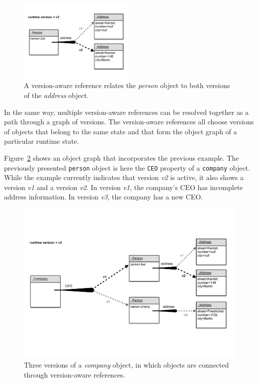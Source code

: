 \begin{figure}[h]
    \centering
    \includegraphics[width=0.5\textwidth]{figures/4_approach/5_versionAwareReferenceFollowingVersion2.pdf}
    \caption{A version-aware reference relates the \emph{person} object to both versions of the \emph{address} object.}
    \label{fig:VersionAwareReferenceFollowingVersion2}
\end{figure}

In the same way, multiple version-aware references can be resolved together as a path through a graph of versions.
The version-aware references all choose versions of objects that belong to the same state and that form the object graph of a particular runtime state.

Figure~\ref{fig:ObjectGraphWithWithReferencesResolvedAlongVersion2} shows an object graph that incorporates the previous example.
The previously presented \lstinline{person} object is here the \lstinline{CEO} property of a \lstinline{company} object.
While the example currently indicates that version \emph{v2} is active, it also shows a version \emph{v1} and a version \emph{v2}.
In version \emph{v1}, the company's CEO has incomplete address information.
In version \emph{v3}, the company has a new CEO.

\begin{figure}[h]
    \centering
    \includegraphics[width=\textwidth]{figures/4_approach/6_objectGraphWithVersonAwareReferences.pdf}
    \caption{Three versions of a \emph{company} object, in which objects are connected through version-aware references.}
    \label{fig:ObjectGraphWithWithReferencesResolvedAlongVersion2}
\end{figure}

